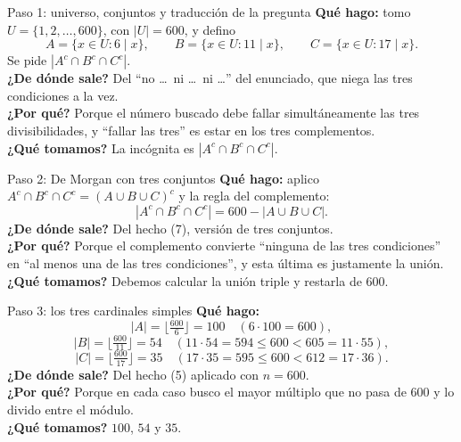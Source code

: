 \documentclass[11pt]{article}
\begin{document}
\begin{sol}

\begin{paso}{Paso 1: universo, conjuntos y traducci\'on de la pregunta}
\textbf{Qu\'e hago:} tomo $U=\{1,2,\dots,600\}$, con $|U|=600$, y defino
\[
A=\{x\in U: 6\mid x\},\qquad B=\{x\in U: 11\mid x\},\qquad C=\{x\in U: 17\mid x\}.
\]
Se pide $|A^{c}\cap B^{c}\cap C^{c}|$.\\
\textbf{¿De d\'onde sale?} Del ``no \dots\ ni \dots\ ni \dots'' del enunciado, que niega las tres condiciones a la vez.\\
\textbf{¿Por qu\'e?} Porque el n\'umero buscado debe fallar simult\'aneamente las tres divisibilidades, y ``fallar las tres'' es estar en los tres complementos.\\
\textbf{¿Qu\'e tomamos?} La inc\'ognita es $|A^{c}\cap B^{c}\cap C^{c}|$.
\end{paso}

\begin{paso}{Paso 2: De Morgan con tres conjuntos}
\textbf{Qu\'e hago:} aplico $A^{c}\cap B^{c}\cap C^{c} = (A\cup B\cup C)^{c}$ y la regla del complemento:
\[
|A^{c}\cap B^{c}\cap C^{c}| = 600 - |A\cup B\cup C| .
\]
\textbf{¿De d\'onde sale?} Del hecho (7), versi\'on de tres conjuntos.\\
\textbf{¿Por qu\'e?} Porque el complemento convierte ``ninguna de las tres condiciones'' en ``al menos una de las tres condiciones'', y esta \'ultima es justamente la uni\'on.\\
\textbf{¿Qu\'e tomamos?} Debemos calcular la uni\'on triple y restarla de $600$.
\end{paso}

\begin{paso}{Paso 3: los tres cardinales simples}
\textbf{Qu\'e hago:}
\[
|A| = \Big\lfloor \tfrac{600}{6}\Big\rfloor = 100 \quad (6\cdot 100 = 600),
\]
\[
|B| = \Big\lfloor \tfrac{600}{11}\Big\rfloor = 54 \quad (11\cdot 54 = 594 \le 600 < 605 = 11\cdot 55),
\]
\[
|C| = \Big\lfloor \tfrac{600}{17}\Big\rfloor = 35 \quad (17\cdot 35 = 595 \le 600 < 612 = 17\cdot 36).
\]
\textbf{¿De d\'onde sale?} Del hecho (5) aplicado con $n=600$.\\
\textbf{¿Por qu\'e?} Porque en cada caso busco el mayor m\'ultiplo que no pasa de $600$ y lo divido entre el m\'odulo.\\
\textbf{¿Qu\'e tomamos?} $100$, $54$ y $35$.
\end{paso}


\end{sol}
\end{document}
